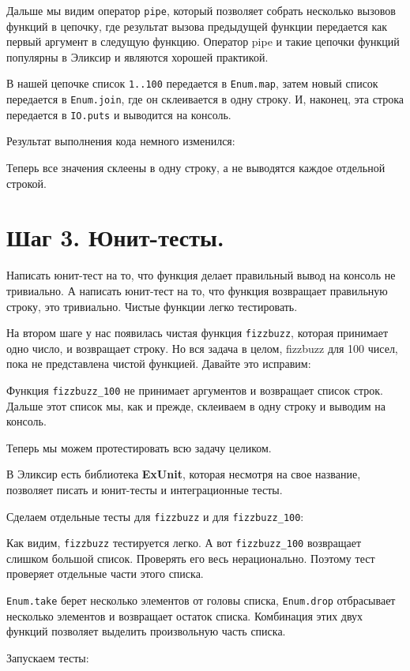 Дальше мы видим оператор \texttt{pipe}, который позволяет собрать несколько вызовов функций в цепочку, где результат вызова предыдущей функции передается как первый аргумент в следущую функцию. Оператор pipe и такие цепочки функций популярны в Эликсир и являются хорошей практикой.

В нашей цепочке список \texttt{1..100} передается в \texttt{Enum.map}, затем новый список передается в \texttt{Enum.join}, где он склеивается в одну строку. И, наконец, эта строка передается в \texttt{IO.puts} и выводится на консоль.

Результат выполнения кода немного изменился:



Теперь все значения склеены в одну строку, а не выводятся каждое отдельной строкой.

\section{Шаг 3. Юнит-тесты.}

Написать юнит-тест на то, что функция делает правильный вывод на консоль не тривиально. А написать юнит-тест на то, что функция возвращает правильную строку, это тривиально. Чистые функции легко тестировать.

На втором шаге у нас появилась чистая функция \texttt{fizzbuzz}, которая принимает одно число, и возвращает строку. Но вся задача в целом, fizzbuzz для 100 чисел, пока не представлена чистой функцией. Давайте это исправим:



Функция \texttt{fizzbuzz\_100} не принимает аргументов и возвращает список строк. Дальше этот список мы, как и прежде, склеиваем в одну строку и выводим на консоль. 

Теперь мы можем протестировать всю задачу целиком.

В Эликсир есть библиотека \textbf{ExUnit}, которая несмотря на свое название, позволяет писать и юнит-тесты и интеграционные тесты.

Сделаем отдельные тесты для \texttt{fizzbuzz} и для \texttt{fizzbuzz\_100}:



Как видим, \texttt{fizzbuzz} тестируется легко. А вот \texttt{fizzbuzz\_100} возвращает слишком большой список. Проверять его весь нерационально. Поэтому тест проверяет отдельные части этого списка.

\texttt{Enum.take} берет несколько элементов от головы списка, \texttt{Enum.drop} отбрасывает несколько элементов и возвращает остаток списка. Комбинация этих двух функций позволяет выделить произвольную часть списка.

Запускаем тесты:


